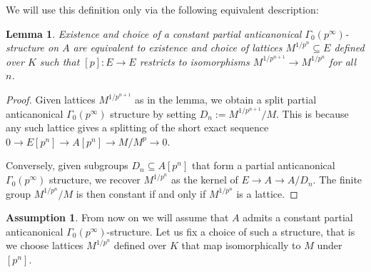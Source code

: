 \documentclass[11pt,oneside]{amsart}
\newtheorem{lemma}[theorem]{Lemma}
\theoremstyle{definition}
\newtheorem{assumption}[theorem]{Assumption}
\theoremstyle{remark}
\begin{document}
	We will use this definition only via the following equivalent description:
	\begin{lemma}
		Existence and choice of a constant partial anticanonical $\Gamma_0(p^\infty)$-structure on $A$ are equivalent to existence and choice of lattices $M^{1/p^n}\subseteq E$ defined over $K$ such that $[p]:E\rightarrow E$ restricts to isomorphisms $M^{1/p^{n+1}}\rightarrow M^{1/p^n}$ for all $n$.
	\end{lemma}
	\begin{proof}
		Given lattices $M^{1/p^{n+1}}$ as in the lemma, we obtain a split partial anticanonical $\Gamma_0(p^\infty)$ structure by setting $D_n:=M^{1/p^{n+1}}/M$. This is because any such lattice gives a splitting of the short exact sequence $0\rightarrow E[p^n]\rightarrow A[p^n]\rightarrow M/M^p \rightarrow 0$.
		
		Conversely, given subgroups $D_n\subseteq A[p^n]$ that form a partial anticanonical $\Gamma_0(p^\infty)$ structure, we recover $M^{1/p^n}$ as the kernel of $E\rightarrow A\rightarrow A/D_n$. The finite group $M^{1/p^n}/M$ is then constant if and only if $M^{1/p^n}$ is a lattice.
	\end{proof}
	
		
	\begin{assumption}\label{assumption that points of D_n are defined over K}
		From now on we will assume that $A$ admits a constant partial anticanonical $\Gamma_0(p^\infty)$-structure. Let us fix a choice of such a structure, that is we choose
		 lattices $M^{1/p^n}$ defined over $K$ that map isomorphically to $M$ under $[p^n]$.
	\end{assumption}
		
\end{document}

